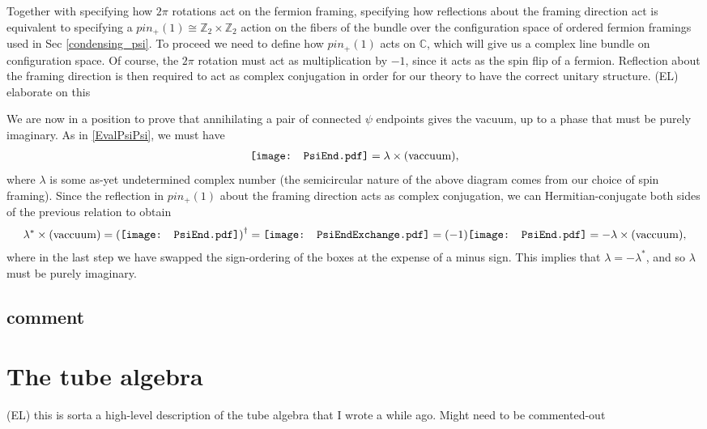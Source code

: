 \documentclass[12pt,a4paper]{article}
\newcommand{\cc}{\mathbb{C}}
\newcommand{\zt}{\mathbb{Z}_2}
\newcommand{\ethan}[1]{{\color{amethyst}\footnotesize{(EL) #1}}}
\newcommand{\PsiEnd}{\mathord{\vcenter{\hbox{\texttt{[image: PsiEnd.pdf]}}}}}
\newcommand{\PsiEndExchange}{\mathord{\vcenter{\hbox{\texttt{[image: PsiEndExchange.pdf]}}}}}
\begin{document}
Together with specifying how $2\pi$ rotations act on the fermion framing, specifying how reflections about the framing direction act is equivalent to specifying a $pin_+(1) \cong \zt \times \zt$ action on the fibers of the bundle over the configuration space of ordered fermion framings used in Sec \ref{condensing_psi}. To proceed we need to define how $pin_+(1)$ acts on $\cc$, which will give us a complex line bundle on configuration space. Of course, the $2\pi$ rotation must act as multiplication by $-1$, since it acts as the spin flip of a fermion. Reflection about the framing direction is then required to act as complex conjugation in order for our theory to have the correct unitary structure. \ethan{elaborate on this}

We are now in a position to prove that annihilating a pair of connected $\psi$ endpoints gives the vacuum, up to a phase that must be purely imaginary. As in \eqref{EvalPsiPsi}, we must have 
\begin{align}
\PsiEnd  = \lambda \times \text{(vaccuum)},
\end{align}
where $\lambda$ is some as-yet undetermined complex number (the semicircular nature of the above diagram comes from our choice of spin framing). Since the reflection in $pin_+(1)$ about the framing direction acts as complex conjugation, we can Hermitian-conjugate both sides of the previous relation to obtain
\begin{align}
\lambda^{*} \times ({\rm vaccuum}) = \left( \PsiEnd \right) ^{\dagger}  = \PsiEndExchange = (-1) \PsiEnd  = - \lambda \times ({\rm vaccuum}),
\label{phase}
\end{align}
where in the last step we have swapped the sign-ordering of the boxes at the expense of a minus sign. 
This implies that $\lambda = - \lambda^*$, and so $\lambda$ must be purely imaginary. 
 
 


 
\subsection{comment}
\section{The tube algebra} \label{tube_alg}
\ethan{this is sorta a high-level description of the tube algebra that I wrote a while ago. Might need to be commented-out} 
\end{document}
